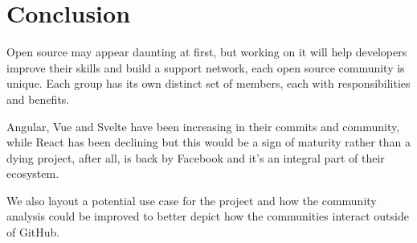 \section{Conclusion}
Open source may appear daunting at first, but working on it will help developers improve their skills and build a support network, each open source community is unique. Each group has its own distinct set of members, each with responsibilities and benefits.

Angular, Vue and Svelte have been increasing in their commits and community, while React has been declining but this would be a sign of maturity rather than a dying project, after all, is back by Facebook and it's an integral part of their ecosystem.

We also layout a potential use case for the project and how the community analysis could be improved to better depict how the communities interact outside of GitHub.

